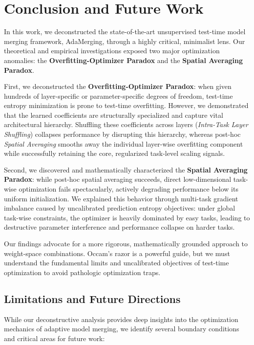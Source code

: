 \section{Conclusion and Future Work}
\label{submission:conclusion}

In this work, we deconstructed the state-of-the-art unsupervised test-time model merging framework, AdaMerging, through a highly critical, minimalist lens. Our theoretical and empirical investigations exposed two major optimization anomalies: the \textbf{Overfitting-Optimizer Paradox} and the \textbf{Spatial Averaging Paradox}.

First, we deconstructed the \textbf{Overfitting-Optimizer Paradox}: when given hundreds of layer-specific or parameter-specific degrees of freedom, test-time entropy minimization is prone to test-time overfitting. However, we demonstrated that the learned coefficients are structurally specialized and capture vital architectural hierarchy. Shuffling these coefficients across layers (\emph{Intra-Task Layer Shuffling}) collapses performance by disrupting this hierarchy, whereas post-hoc \emph{Spatial Averaging} smooths away the individual layer-wise overfitting component while successfully retaining the core, regularized task-level scaling signals. 

Second, we discovered and mathematically characterized the \textbf{Spatial Averaging Paradox}: while post-hoc spatial averaging succeeds, direct low-dimensional task-wise optimization fails spectacularly, actively degrading performance below its uniform initialization. We explained this behavior through multi-task gradient imbalance caused by uncalibrated prediction entropy objectives: under global task-wise constraints, the optimizer is heavily dominated by easy tasks, leading to destructive parameter interference and performance collapse on harder tasks.

Our findings advocate for a more rigorous, mathematically grounded approach to weight-space combinations. Occam's razor is a powerful guide, but we must understand the fundamental limits and uncalibrated objectives of test-time optimization to avoid pathologic optimization traps.

\subsection{Limitations and Future Directions}
While our deconstructive analysis provides deep insights into the optimization mechanics of adaptive model merging, we identify several boundary conditions and critical areas for future work:

